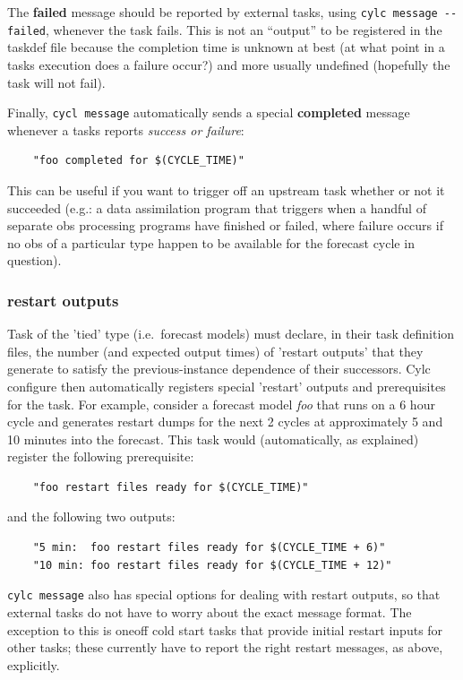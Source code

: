 \documentclass[11pt,a4paper]{article}
\begin{document}
The {\bf failed} message should be reported by external tasks, using 
\lstinline=cylc message --failed=, whenever the task fails. This is 
not an ``output'' to be registered in the taskdef file because the
completion time is unknown at best (at what point in a tasks execution
does a failure occur?) and more usually undefined (hopefully the task
will not fail). 

Finally, \lstinline=cycl message= automatically sends a special {\bf
completed} message whenever a tasks reports {\em success or failure}:
\begin{lstlisting}
    "foo completed for $(CYCLE_TIME)"
\end{lstlisting}
 
This can be useful if you want to trigger off an upstream task whether
or not it succeeded (e.g.: a data assimilation program that triggers
when a handful of separate obs processing programs have finished or
failed, where failure occurs if no obs of a particular type happen to be
available for the forecast cycle in question).

\subsubsection{restart outputs}

Task of the 'tied' type (i.e.\ forecast models) must declare, in their
task definition files, the number (and expected output times) of
'restart outputs' that they generate to satisfy the previous-instance
dependence of their successors. Cylc configure then automatically
registers special 'restart' outputs and prerequisites for the task.
For example, consider a forecast model {\em foo} that runs on a
6 hour cycle and generates restart dumps for the next 2 cycles at
approximately 5 and 10 minutes into the forecast. This task would  
(automatically, as explained) register the following prerequisite:

\begin{lstlisting}
    "foo restart files ready for $(CYCLE_TIME)"
\end{lstlisting}

and the following two outputs:

\begin{lstlisting}
    "5 min:  foo restart files ready for $(CYCLE_TIME + 6)"
    "10 min: foo restart files ready for $(CYCLE_TIME + 12)"
\end{lstlisting}

\lstinline=cylc message= also has special options for dealing with 
restart outputs, so that external tasks do not have to worry about the
exact message format. The exception to this is oneoff cold start tasks
that provide initial restart inputs for other tasks; these currently 
have to report the right restart messages, as above, explicitly.
\end{document}
